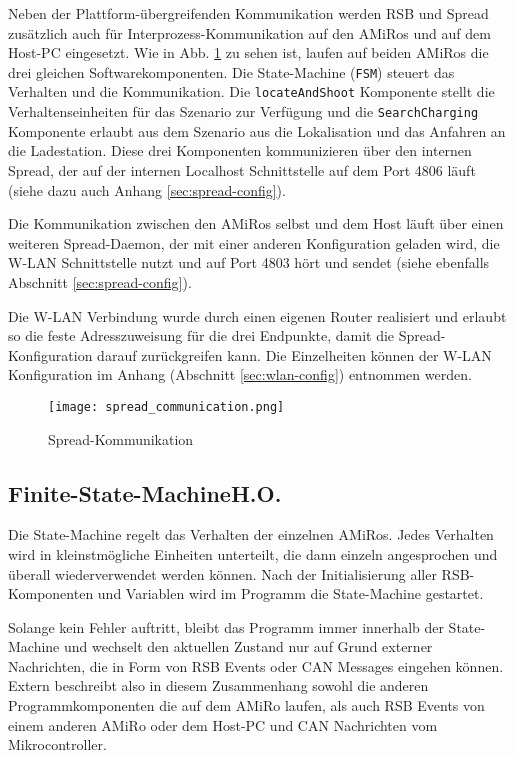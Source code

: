 Neben der Plattform-übergreifenden Kommunikation werden RSB und Spread zusätzlich auch für Interprozess-Kommunikation auf den AMiRos und auf dem Host-PC eingesetzt. Wie in Abb. \ref{fig:spread} zu sehen ist, laufen auf beiden AMiRos die drei gleichen Softwarekomponenten. Die State-Machine (\texttt{FSM}) steuert das Verhalten und die Kommunikation. Die \texttt{locateAndShoot} Komponente stellt die Verhaltenseinheiten für das Szenario zur Verfügung und die \texttt{SearchCharging} Komponente erlaubt aus dem Szenario aus die Lokalisation und das Anfahren an die Ladestation. Diese drei Komponenten kommunizieren über den internen Spread, der auf der internen Localhost Schnittstelle auf dem Port 4806 läuft (siehe dazu auch Anhang \ref{sec:spread-config}).

Die Kommunikation zwischen den AMiRos selbst und dem Host läuft über einen weiteren Spread-Daemon, der mit einer anderen Konfiguration geladen wird, die W-LAN Schnittstelle nutzt und auf Port  4803 hört und sendet (siehe ebenfalls Abschnitt \ref{sec:spread-config}).

Die W-LAN Verbindung wurde durch einen eigenen Router realisiert und erlaubt so die feste Adresszuweisung für die drei Endpunkte, damit die Spread-Konfiguration darauf zurückgreifen kann. Die Einzelheiten können der W-LAN Konfiguration im Anhang (Abschnitt \ref{sec:wlan-config}) entnommen werden.
\begin{figure}
	\begin{center}
		\texttt{[image: spread\_communication.png]} 	
		\caption{Spread-Kommunikation}
		\label{fig:spread}
	\end{center}
\end{figure}


\subsection[Finite-State-Machine]{Finite-State-Machine\hfill {\normalsize H.O.}}
Die State-Machine regelt das Verhalten der einzelnen AMiRos. Jedes Verhalten wird in kleinstmögliche Einheiten unterteilt, die dann einzeln angesprochen und überall wiederverwendet werden können. Nach der Initialisierung aller RSB-Komponenten und Variablen wird im Programm die State-Machine gestartet.

Solange kein Fehler auftritt, bleibt das Programm immer innerhalb der State-Machine und wechselt den aktuellen Zustand nur auf Grund externer Nachrichten, die in Form von RSB Events oder CAN Messages eingehen können. Extern beschreibt also in diesem Zusammenhang sowohl die anderen Programmkomponenten die auf dem AMiRo laufen, als auch RSB Events von einem anderen AMiRo oder dem Host-PC und CAN Nachrichten vom Mikrocontroller.

